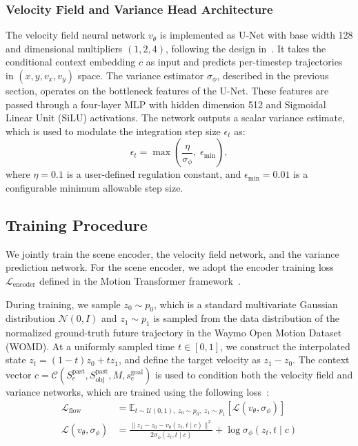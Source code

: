 \documentclass[conference]{IEEEtran}
\begin{document}
\vspace{0.5em}
\subsubsection*{Velocity Field and Variance Head Architecture}
The velocity field neural network \( v_\theta \) is implemented as U-Net with base width 128 and dimensional multipliers \((1, 2, 4)\), following the design in~\cite{unet}. It takes the conditional context embedding \( c \) as input and predicts per-timestep trajectories in \((x, y, v_x, v_y)\) space. The variance estimator \( \sigma_\phi \), described in the previous section, operates on the bottleneck features of the U-Net. These features are passed through a four-layer MLP with hidden dimension 512 and Sigmoidal Linear Unit (SiLU) activations. The network outputs a scalar variance estimate, which is used to modulate the integration step size \( \epsilon_t \) as:
\begin{equation}\label{step_size}
    \epsilon_t = \max \left( \frac{\eta}{\sigma_\phi},\; \epsilon_{\text{min}} \right),
\end{equation}
where \( \eta=0.1 \) is a user-defined regulation constant, and \( \epsilon_{\text{min}}=0.01 \) is a configurable minimum allowable step size.

\subsection{Training Procedure}
We jointly train the scene encoder, the velocity field network, and the variance prediction network. For the scene encoder, we adopt the encoder training loss \( \mathcal{L}_{\text{encoder}} \) defined in the Motion Transformer framework~\cite{mtr}.

During training, we sample $z_0 \sim p_0$, which is a standard multivariate Gaussian distribution $\mathcal{N}(0, I)$ and $z_1 \sim p_1$ is sampled from the data distribution of the normalized ground-truth future trajectory in the Waymo Open Motion Dataset (WOMD). At a uniformly sampled time \( t \in [0, 1] \), we construct the interpolated state \( z_t = (1 - t) z_0 + t z_1 \), and define the target velocity as \( z_1 - z_0 \). The context vector \( c = \mathcal{C}(S_e^{\text{past}}, S_{\text{obj}}^{\text{past}}, M, s_e^{\text{goal}}) \) is used to condition both the velocity field and variance networks, which are trained using the following loss~\cite{adaflow}:
\begin{align}
\mathcal{L}_{\text{flow}} &= \mathbb{E}_{t \sim \mathcal{U}(0, 1), \; z_0 \sim p_0, \; z_1 \sim p_1} \left[ \mathcal{L}(v_\theta, \sigma_\phi) \right] \label{eq:flow_loss} \\
\mathcal{L}(v_\theta, \sigma_\phi) &= 
\frac{\| z_1 - z_0 - v_\theta(z_t, t \mid c) \|^2}{2 \sigma_\phi(z_t, t \mid c)} 
+ \log \sigma_\phi(z_t, t \mid c) \nonumber
\end{align}
\end{document}
